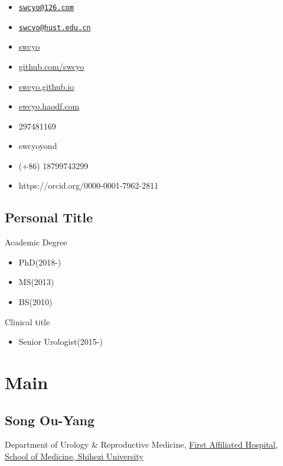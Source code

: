 \documentclass[]{article}
\providecommand{\tightlist}{%
  \setlength{\itemsep}{0pt}\setlength{\parskip}{0pt}}
\begin{document}
\begin{itemize}
\item
   \href{mailto:swcyo@126.com}{\nolinkurl{swcyo@126.com}}
\item
   \href{mailto:swcyo@hust.edu.cn}{\nolinkurl{swcyo@hust.edu.cn}}
\item
   \href{http://weibo.com/swcyo}{swcyo}
\item
   \href{http://github.com/swcyo}{github.com/swcyo}
\item
   \href{http://swcyo.github.io}{swcyo.github.io}
\item
   \href{http://swcyo.haodf.com}{swcyo.haodf.com}
\item
   297481169
\item
   swcyoyond
\item
   (+86) 18799743299
\item
  https://orcid.org/0000-0001-7962-2811
\end{itemize}

\hypertarget{skills}{%
\subsection{Personal Title}\label{skills}}

Academic Degree

\begin{itemize}
\tightlist
\item
  PhD(2018-)
\item
  MS(2013)
\item
  BS(2010)
\end{itemize}

Clinical title

\begin{itemize}
\tightlist
\item
  Senior Urologist(2015-)
\end{itemize}

\hypertarget{main}{%
\section{Main}\label{main}}

\hypertarget{title}{%
\subsection{Song Ou-Yang}\label{title}}

Department of Urology \& Reproductive Medicine,
\href{http://www.sdyfy.com.cn/}{First Affiliated Hospital, School of
Medicine, Shihezi University}
\end{document}

